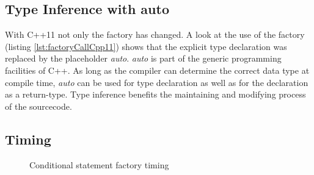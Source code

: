 { %
\subsection{Type Inference with auto}\label{sec:typeDeduction}
With C++11 not only the factory has changed. A look at the use of the factory (listing \ref{lst:factoryCallCpp11}) shows that the explicit type declaration was replaced by the placeholder \emph{auto}. \emph{auto} is part of the generic programming facilities of C++. As long as the compiler can determine the correct data type at compile time, \emph{auto} can be used for type declaration as well as for the declaration as a return-type. \cite[cf.][210 - 211]{Kirch2015} Type inference benefits the maintaining and modifying process of the sourcecode. 



\FloatBarrier

\subsection{Timing}\label{sec:timingConditionalStatementFactory}

\begin{figure}[h]{}
\centering
\mbox{}
\caption{Conditional statement factory timing}
\label{fig:conditionalStatementFactoryTiming}
\end{figure}

}

